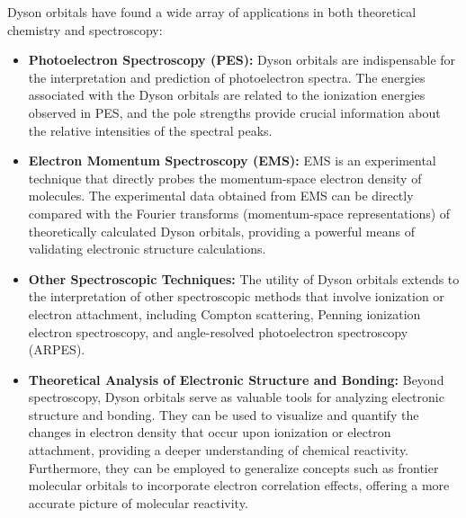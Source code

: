 Dyson orbitals have found a wide array of applications in both theoretical chemistry and spectroscopy:
\begin{itemize}
    \item \textbf{Photoelectron Spectroscopy (PES):} Dyson orbitals are indispensable for the interpretation and prediction of photoelectron spectra. The energies associated with the Dyson orbitals are related to the ionization energies observed in PES, and the pole strengths provide crucial information about the relative intensities of the spectral peaks.
    \item \textbf{Electron Momentum Spectroscopy (EMS):} EMS is an experimental technique that directly probes the momentum-space electron density of molecules. The experimental data obtained from EMS can be directly compared with the Fourier transforms (momentum-space representations) of theoretically calculated Dyson orbitals, providing a powerful means of validating electronic structure calculations.
    \item \textbf{Other Spectroscopic Techniques:} The utility of Dyson orbitals extends to the interpretation of other spectroscopic methods that involve ionization or electron attachment, including Compton scattering, Penning ionization electron spectroscopy, and angle-resolved photoelectron spectroscopy (ARPES).
    \item \textbf{Theoretical Analysis of Electronic Structure and Bonding:} Beyond spectroscopy, Dyson orbitals serve as valuable tools for analyzing electronic structure and bonding. They can be used to visualize and quantify the changes in electron density that occur upon ionization or electron attachment, providing a deeper understanding of chemical reactivity. Furthermore, they can be employed to generalize concepts such as frontier molecular orbitals to incorporate electron correlation effects, offering a more accurate picture of molecular reactivity.
\end{itemize}

\cleardoublepage

